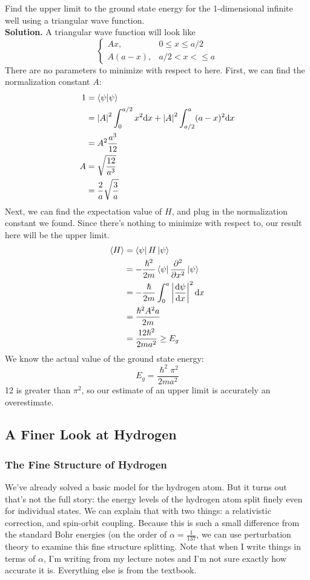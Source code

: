 \documentclass[a4paper]{article}
\begin{document}
\begin{eg}
	Find the upper limit to the ground state energy for the 1-dimensional
	infinite well using a triangular wave function.\\
	\textbf{Solution.}
	A triangular wave function will look like
	\[
		\begin{cases}
			Ax, & 0\leq x \leq a/2\\
			A(a-x), & a/2 < x <\leq a
		\end{cases}
	\]
	There are no parameters to minimize with respect to here. First,
	we can find the normalization constant $A$:
	\begin{align*}
		1 &= \left\langle \psi\middle\vert \psi \right\rangle\\
		  &= \left\lvert A\right\rvert^2\int_0^{a/2}x^2\mathrm{d} x +
		     \left\lvert A\right\rvert^2\int_{a/2}^a(a-x)^2\mathrm{d} x\\
		  &= A^2\frac{a^3}{12}\\
		A &= \sqrt{\frac{12}{a^3}}\\
		  &= \frac{2}{a}\sqrt{\frac{3}{a}}
	\end{align*}
	Next, we can find the expectation value of $H$, and plug in the
	normalization constant we found. Since there's nothing to minimize
	with respect to, our result here will be the upper limit.
	\begin{align*}
		\exval{H} &= \brak{\psi}H\bket{\psi}\\
			  &= -\frac{\hslash^2}{2m}
				\brak{\psi}\pd[2]{x}\bket{\psi}\\
			&= -\frac{\hslash}{2m}
				\int_0^a \abs{\der{\psi}{x}}^2\d x\\
			&= \frac{\hslash^2 A^2 a}{2m}\\
			&= \frac{12\hslash^2}{2ma^2} \geq E_g
	\end{align*}
	We know the actual value of the ground state energy:
	\[ E_g = \frac{\hslash^2\pi^2}{2ma^2} \]
	12 is greater than $\pi^2$, so our estimate of an upper limit is
	accurately an overestimate.
\end{eg}

\subsection{A Finer Look at Hydrogen}
\subsubsection{The Fine Structure of Hydrogen}
	We've already solved a basic model for the hydrogen atom. But it turns
	out that's not the full story: the energy levels of the hydrogen atom
	split finely even for individual states. We can explain that with
	two things: a relativistic correction, and spin-orbit coupling. Because
	this is such a small difference from the standard Bohr energies
	(on the order of $\alpha = \frac{1}{137}$, we can use perturbation
	theory to examine this fine structure splitting. Note that when I write
	things in terms of $\alpha$, I'm writing from my lecture notes and I'm
	not sure exactly how accurate it is. Everything else is from the
	textbook.
\end{document}
